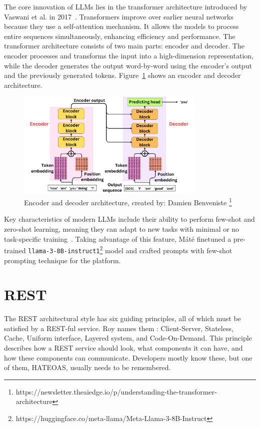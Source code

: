 The core innovation of LLMs lies in the transformer architecture introduced by Vaswani et al. in 2017~\cite{vaswani2017attention}. Transformers improve over earlier neural networks because they use a self-attention mechanism. It allows the models to process entire sequences simultaneously, enhancing efficiency and performance. The transformer architecture consists of two main parts: encoder and decoder. The encoder processes and transforms the input into a high-dimension representation, while the decoder generates the output word-by-word using the encoder's output and the previously generated tokens. Figure~\ref{fig:encoder-and-decoder} shows an encoder and decoder architecture.

\begin{figure}[H]
  \centering
  \includegraphics[width=0.8\textwidth, keepaspectratio]{figures/encoder-and-decoder.png}
  \caption{Encoder and decoder architecture, created by: Damien Benveniste \footnote{https://newsletter.theaiedge.io/p/understanding-the-transformer-architecture}}
  \label{fig:encoder-and-decoder}
\end{figure}

Key characteristics of modern LLMs include their ability to perform few-shot and zero-shot learning, meaning they can adapt to new tasks with minimal or no task-specific training~\cite{brown2020language}. Taking advantage of this feature, Máté finetuned a pre-trained \texttt{llama-3-8B-instruct1}\footnote{https://huggingface.co/meta-llama/Meta-Llama-3-8B-Instruct} model and crafted prompts with few-shot prompting technique for the platform.

\section{REST}

The REST architectural style has six guiding principles, all of which must be satisfied by a REST-ful service. Roy names them \cite[Chapter 5]{fielding2000}: Client-Server, Stateless, Cache, Uniform interface, Layered system, and Code-On-Demand. This principle describes how a REST service should look, what components it can have, and how these components can communicate. Developers mostly know these, but one of them, HATEOAS, usually needs to be remembered.

